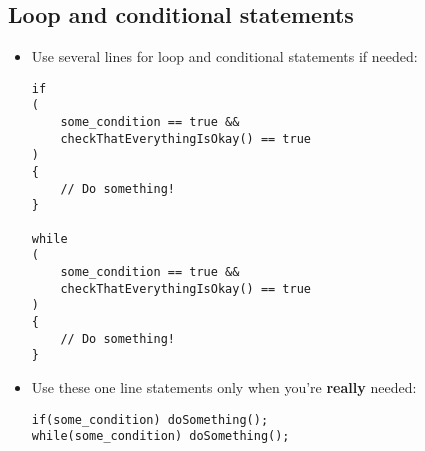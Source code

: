 \documentclass[12pt]{article}
\begin{document}
		\subsection{Loop and conditional statements}
			\begin{itemize}
				\item Use several lines for loop and conditional statements if needed:
					\begin{lstlisting}
if
(
	some_condition == true &&
	checkThatEverythingIsOkay() == true
)
{
	// Do something!
}

while
(
	some_condition == true &&
	checkThatEverythingIsOkay() == true
)
{
	// Do something!
}
					\end{lstlisting}
				\item Use these one line statements only when you're \textbf{really} needed:
\begin{lstlisting}
if(some_condition) doSomething();
while(some_condition) doSomething();
\end{lstlisting}
			\end{itemize}
\end{document}
